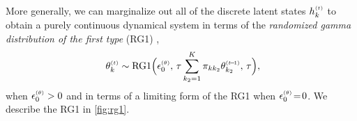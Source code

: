\documentclass{article}
\begin{document}
More generally, we can marginalize out all of the discrete latent states $\hkt$ to obtain a purely continuous dynamical system in terms of the \emph{randomized gamma distribution of the first type} (RG1) \cite{yuan2000bessel,makarov2010exact},~
\begin{equation}
\
\thetakt \sim \textrm{RG1}\Big(\epstheta,\,\tau\sum_{k_2=1}^K \pi_{kk_2} \thetakttm,\, \tau\Big),
% 
\end{equation}
when $\epstheta > 0$ and in terms of a limiting form of the RG1 when $\epstheta \teq 0$. We describe the RG1 in \cref{fig:rg1}.~


\end{document}
